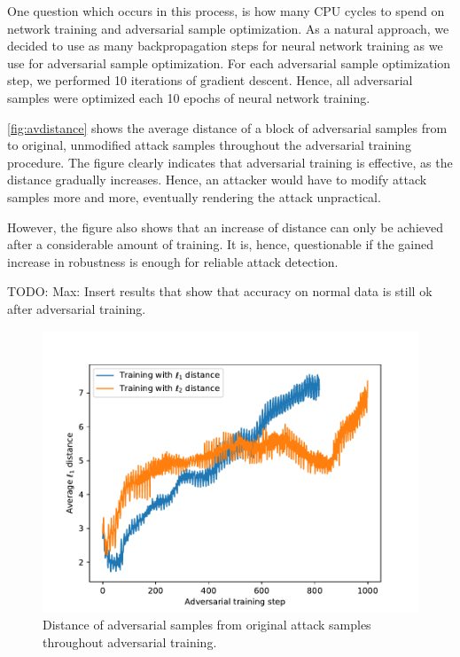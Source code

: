 \documentclass[conference]{IEEEtran}
\newcommand\note[2]{{\color{#1}#2}}
\newcommand\todo[1]{{\note{red}{TODO: #1}}}
\begin{document}
One question which occurs in this process, is how many CPU cycles to spend on network training and adversarial sample optimization. As a natural approach, we decided to use as many backpropagation steps for neural network training as we use for adversarial sample optimization.  For each adversarial sample optimization step, we performed 10 iterations of gradient descent. Hence, all adversarial samples were optimized each 10 epochs of neural network training.

\autoref{fig:avdistance} shows the average distance of a block of adversarial samples from to original, unmodified attack samples throughout the adversarial training procedure. The figure clearly indicates that adversarial training is effective, as the distance gradually increases. Hence, an attacker would have to modify attack samples more and more, eventually rendering the attack unpractical.

However, the figure also shows that an increase of distance can only be achieved after a considerable amount of training. It is, hence, questionable if the gained increase in robustness is enough for reliable attack detection.

\todo{Max: Insert results that show that accuracy on normal data is still ok after adversarial training.}

\begin{figure}
\includegraphics[width=\columnwidth]{../plots/adv_training/avdistance.pdf}
\caption{Distance of adversarial samples from original attack samples throughout adversarial training.}
\label{fig:avdistance}
\end{figure}
\end{document}
